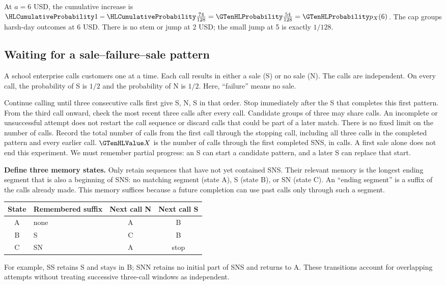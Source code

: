 \cTwoConnectionReading
\par\smallskip At $a=6$ USD, the cumulative increase is $\cTwoCDFHL{1}-\cTwoCDFHL{\frac{74}{128}}=\cTwoMassHL{\frac{54}{128}}=\cTwoMassHL{p_X(6)}$. The cap groups harsh-day outcomes at 6 USD. There is no stem or jump at 2 USD; the small jump at 5 is exactly $1/128$.
\ifGTenHighlights\else\par\vspace{3mm}\fi
{}


\clearpage
\subsection{Waiting for a sale--failure--sale pattern}\label{prob:calls}
A school enterprise calls customers one at a time. Each call results in either a sale (S) or no sale (N). The calls are independent. On every call, the probability of S is $1/2$ and the probability of N is $1/2$. Here, ``failure'' means no sale.

Continue calling until three consecutive calls first give S, N, S in that order. Stop immediately after the S that completes this first pattern. From the third call onward, check the most recent three calls after every call. Candidate groups of three may share calls. An incomplete or unsuccessful attempt does not restart the call sequence or discard calls that could be part of a later match. There is no fixed limit on the number of calls. Record the total number of calls from the first call through the stopping call, including all three calls in the completed pattern and every earlier call.
$\cTwoValue{X}$ is the number of calls through the first completed SNS, in calls. A first sale alone does not end this experiment. We must remember partial progress: an S can start a candidate pattern, and a later S can replace that start.

\textbf{Define three memory states.} Only retain sequences that have not yet contained SNS. Their relevant memory is the longest ending segment that is also a beginning of SNS: no matching segment (state A), S (state B), or SN (state C). An ``ending segment'' is a suffix of the calls already made. This memory suffices because a future completion can use past calls only through such a segment.
\begin{center}\begin{tabular}{clcc}\toprule
State & Remembered suffix & Next call N & Next call S \\\midrule
A & none & A & B \\
B & S & C & B \\
C & SN & A & stop \\\bottomrule\end{tabular}\end{center}
For example, SS retains S and stays in B; SNN retains no initial part of SNS and returns to A. These transitions account for overlapping attempts without treating successive three-call windows as independent.


